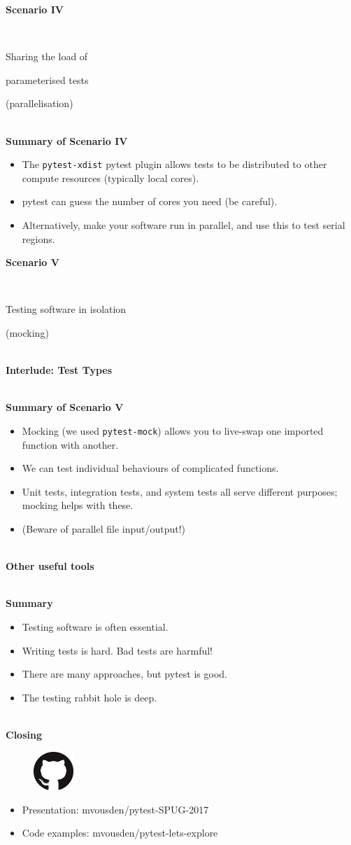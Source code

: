 \documentclass[12pt]{article}
\newlength{\geometrytop}
\newcommand{\slidetitle}[1]{~\\[-0.5ex]{\Large\bf{\color{bold}#1}}\\}
\begin{document}
\thispagestyle{plain}
\vspace*{-\topskip}
\vspace*{\fill}
{\Huge\centerline{\textbf{Scenario IV}}~\newline
\centerline{Sharing the load of}
\centerline{parameterised tests}
\centerline{(parallelisation)}}
\vspace*{\fill}
\vspace*{\geometrytop}
\clearpage

\slidetitle{Summary of Scenario IV}
\begin{itemize}
\item The \verb|pytest-xdist| pytest plugin allows tests to be distributed to
    other compute resources (typically local cores).
\item pytest can guess the number of cores you need (be careful).
\item Alternatively, make your software run in parallel, and use this to test
    serial regions.
\end{itemize}
\clearpage

\thispagestyle{plain}
\vspace*{-\topskip}
\vspace*{\fill}
{\Huge\centerline{\textbf{Scenario V}}~\newline
\centerline{Testing software in isolation}
\centerline{(mocking)}}
\vspace*{\fill}
\vspace*{\geometrytop}
\clearpage

\slidetitle{Interlude: Test Types}
\clearpage

\slidetitle{Summary of Scenario V}
\begin{itemize}
\item Mocking (we used \verb|pytest-mock|) allows you to live-swap one imported
    function with another.
\item We can test individual behaviours of complicated functions.
\item Unit tests, integration tests, and system tests all serve different
    purposes; mocking helps with these.
\item (Beware of parallel file input/output!)
\end{itemize}
\clearpage

\slidetitle{Other useful tools}
\clearpage

\slidetitle{Summary}
\begin{itemize}
\item Testing software is often essential.
\item Writing tests is hard. Bad tests are harmful!
\item There are many approaches, but pytest is good.
\item The testing rabbit hole is deep.
\end{itemize}
\clearpage

\slidetitle{Closing}
\begin{figure}
\includegraphics[width=1.5cm]{github.png}
\end{figure}
\begin{itemize}[itemsep=0pt]
\item[] Presentation: mvousden/pytest-SPUG-2017
\item[] Code examples: mvousden/pytest-lets-explore
\end{itemize}
\clearpage
\end{document}
